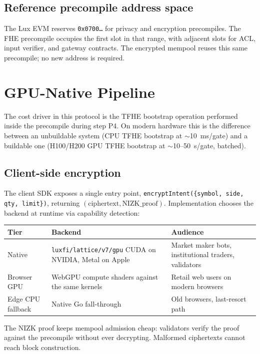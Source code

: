 \documentclass[11pt,a4paper]{article}
\begin{document}
\subsection{Reference precompile address space}

The Lux EVM reserves \texttt{0x0700\dots} for privacy and encryption
precompiles. The FHE precompile occupies the first slot in that
range, with adjacent slots for ACL, input verifier, and gateway
contracts. The encrypted mempool reuses this same precompile; no
new address is required.

\section{GPU-Native Pipeline}

The cost driver in this protocol is the TFHE bootstrap operation
performed inside the precompile during step P4. On modern hardware
this is the difference between an unbuildable system (CPU TFHE
bootstrap at $\sim$10~ms/gate) and a buildable one (H100/H200 GPU
TFHE bootstrap at $\sim$10--50~\textmu s/gate, batched).

\subsection{Client-side encryption}

The client SDK exposes a single entry point,
\texttt{encryptIntent(\{symbol, side, qty, limit\})}, returning
$(\text{ciphertext}, \text{NIZK\_proof})$. Implementation chooses
the backend at runtime via capability detection:

\begin{longtable}{p{3.4cm}p{5.0cm}p{6.2cm}}
\toprule
\textbf{Tier} & \textbf{Backend} & \textbf{Audience} \\
\midrule
Native &
  \texttt{luxfi/lattice/v7/gpu} CUDA on NVIDIA, Metal on Apple &
  Market maker bots, institutional traders, validators \\
Browser GPU &
  WebGPU compute shaders against the same kernels &
  Retail web users on modern browsers \\
Edge CPU fallback &
  Native Go fall-through &
  Old browsers, last-resort path \\
\bottomrule
\end{longtable}

The NIZK proof keeps mempool admission cheap: validators verify the
proof against the precompile without ever decrypting. Malformed
ciphertexts cannot reach block construction.
\end{document}
